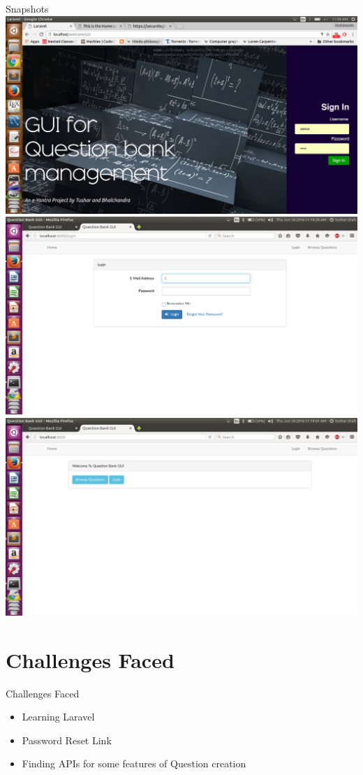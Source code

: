 \documentclass[10pt, a4paper]{beamer}
\begin{document}
\begin{frame}{Snapshots}
	\vspace{2mm} \includegraphics[scale=0.08]{photo3.png} \hspace{1cm}\includegraphics[scale=0.08]{photo4.png}\\
	\vspace{2mm} \includegraphics[scale=0.08]{photo5.png} 
\end{frame}

\section{Challenges Faced}
\begin{frame}{Challenges Faced}
	\begin{itemize}
		\item Learning Laravel
		\item Password Reset Link
		\item Finding APIs for some features of Question creation
	\end{itemize}
\end{frame}
\end{document}
